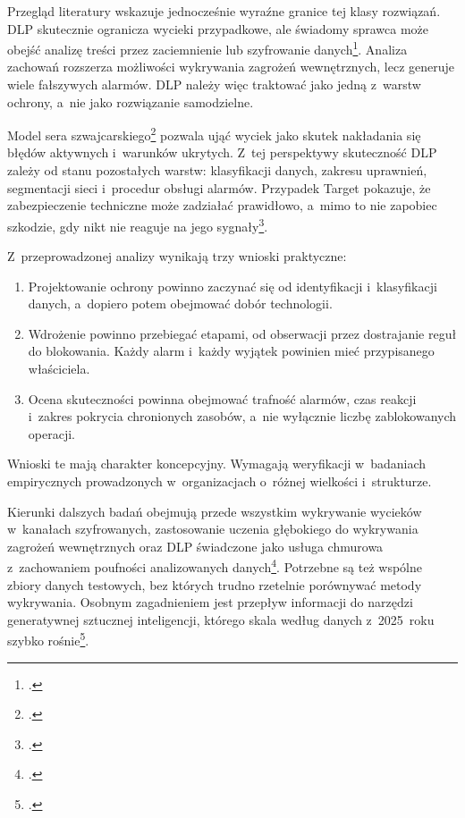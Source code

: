 \documentclass[12pt,a4paper]{article}
\begin{document}
Przegląd literatury wskazuje jednocześnie wyraźne granice tej klasy
rozwiązań. DLP skutecznie ogranicza wycieki przypadkowe, ale świadomy
sprawca może obejść analizę treści przez zaciemnienie lub szyfrowanie
danych\footcite{cheng2017enterprise}. Analiza zachowań rozszerza możliwości
wykrywania zagrożeń wewnętrznych, lecz generuje wiele fałszywych alarmów. DLP
należy więc traktować jako jedną z~warstw ochrony, a~nie jako rozwiązanie
samodzielne.

Model sera szwajcarskiego\footcite{reason2000human} pozwala ująć wyciek jako
skutek nakładania się błędów aktywnych i~warunków ukrytych. Z~tej
perspektywy skuteczność DLP zależy od stanu pozostałych warstw: klasyfikacji
danych, zakresu uprawnień, segmentacji sieci i~procedur obsługi alarmów.
Przypadek Target pokazuje, że zabezpieczenie techniczne może zadziałać
prawidłowo, a~mimo to nie zapobiec szkodzie, gdy nikt nie reaguje na jego
sygnały\footcite{cheng2017enterprise}.

Z~przeprowadzonej analizy wynikają trzy wnioski praktyczne:
\begin{enumerate}
  \item Projektowanie ochrony powinno zaczynać się od identyfikacji
    i~klasyfikacji danych, a~dopiero potem obejmować dobór technologii.
  \item Wdrożenie powinno przebiegać etapami, od obserwacji przez
    dostrajanie reguł do blokowania. Każdy alarm i~każdy wyjątek powinien
    mieć przypisanego właściciela.
  \item Ocena skuteczności powinna obejmować trafność alarmów, czas reakcji
    i~zakres pokrycia chronionych zasobów, a~nie wyłącznie liczbę
    zablokowanych operacji.
\end{enumerate}

Wnioski te mają charakter koncepcyjny. Wymagają weryfikacji w~badaniach
empirycznych prowadzonych w~organizacjach o~różnej wielkości i~strukturze.

Kierunki dalszych badań obejmują przede wszystkim wykrywanie wycieków
w~kanałach szyfrowanych, zastosowanie uczenia głębokiego do wykrywania
zagrożeń wewnętrznych oraz DLP świadczone jako usługa chmurowa z~zachowaniem
poufności analizowanych danych\footcite{cheng2017enterprise}. Potrzebne są
też wspólne zbiory danych testowych, bez których trudno rzetelnie porównywać
metody wykrywania. Osobnym zagadnieniem jest przepływ informacji do narzędzi
generatywnej sztucznej inteligencji, którego skala według danych z~2025~roku
szybko rośnie\footcite{verizon2026dbir}.
\end{document}
